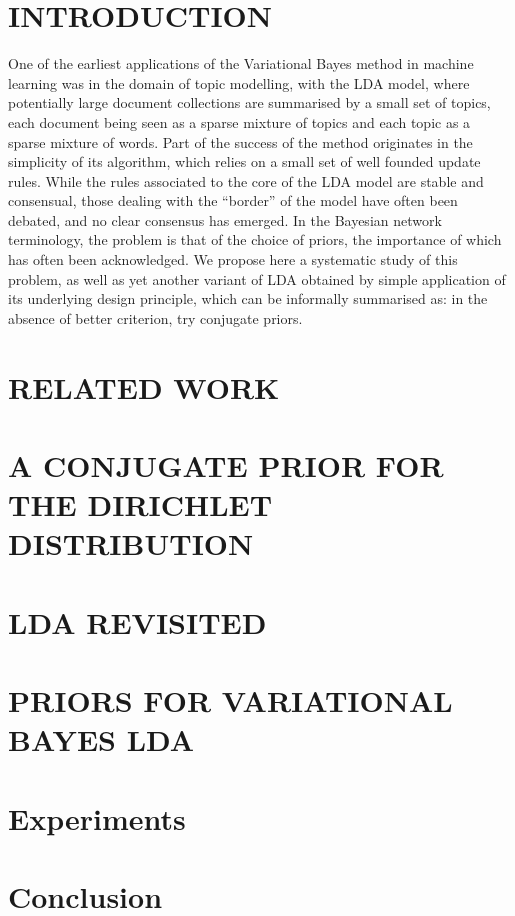 \documentclass[twoside]{article}
\begin{document}
\section{INTRODUCTION}
One of the earliest applications of the Variational Bayes method in machine learning was in the domain of topic modelling, with the LDA model, where potentially large document collections are summarised by a small set of topics, each document being seen as a sparse mixture of topics and each topic as a sparse mixture of words. Part of the success of the method originates in the simplicity of its algorithm, which relies on a small set of well founded update rules. While the rules associated to the core of the LDA model are stable and consensual, those dealing with the ``border'' of the model have often been debated, and no clear consensus has emerged. In the Bayesian network terminology, the problem is that of the choice of priors, the importance of which has often been acknowledged. We propose here a systematic study of this problem, as well as yet another variant of LDA obtained by simple application of its underlying design principle, which can be informally summarised as: in the absence of better criterion, try conjugate priors.
\section{RELATED WORK}

\section{A CONJUGATE PRIOR FOR THE DIRICHLET DISTRIBUTION}
\label{sec:huntingsnark}

\section{LDA REVISITED}
\label{sec:ldarevisited}

\section{PRIORS FOR VARIATIONAL BAYES LDA}
\label{sec:ldawithcprior}

\section{Experiments}

%
\section{Conclusion}



\pagebreak[4] %



\end{document}
